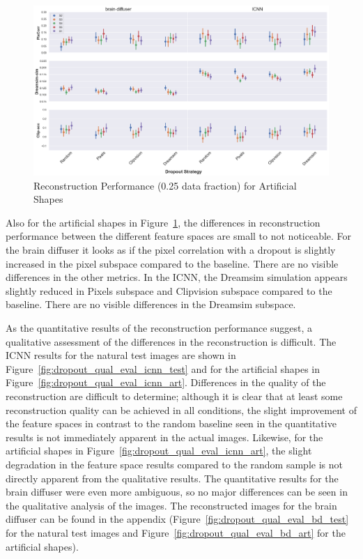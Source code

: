 \begin{figure}[ht]
  \centering
  \includegraphics[width=1\textwidth]{plots/dropout_eval_reconstruction_art.png}
  \caption{Reconstruction Performance (0.25 data fraction) for Artificial Shapes}\label{fig:dropout_eval_reconstruction_art}
\end{figure}


Also for the artificial shapes in Figure~\ref{fig:dropout_eval_reconstruction_art}, the differences in reconstruction performance between the different feature spaces are small to not noticeable. For the brain diffuser it looks as if the pixel correlation with a dropout is slightly increased in the pixel subspace compared to the baseline. There are no visible differences in the other metrics. In the ICNN, the Dreamsim simulation appears slightly reduced in Pixels subspace and Clipvision subspace compared to the baseline. There are no visible differences in the Dreamsim subspace. 

As the quantitative results of the reconstruction performance suggest, a qualitative assessment of the differences in the reconstruction is difficult. The ICNN results for the natural test images are shown in Figure~\ref{fig:dropout_qual_eval_icnn_test} and for the artificial shapes in Figure~\ref{fig:dropout_qual_eval_icnn_art}. Differences in the quality of the reconstruction are difficult to determine; although it is clear that at least some reconstruction quality can be achieved in all conditions, the slight improvement of the feature spaces in contrast to the random baseline  seen in the quantitative results is not immediately apparent in the actual images. Likewise, for the artificial shapes in Figure~\ref{fig:dropout_qual_eval_icnn_art}, the slight degradation in the feature space results compared to the random sample is not directly apparent from the qualitative results. The quantitative results for the brain diffuser were even more ambiguous, so no major differences can be seen in the qualitative analysis of the images. The reconstructed images for the brain diffuser can be found in the appendix (Figure~\ref{fig:dropout_qual_eval_bd_test} for the natural test images and Figure~\ref{fig:dropout_qual_eval_bd_art} for the artificial shapes).


